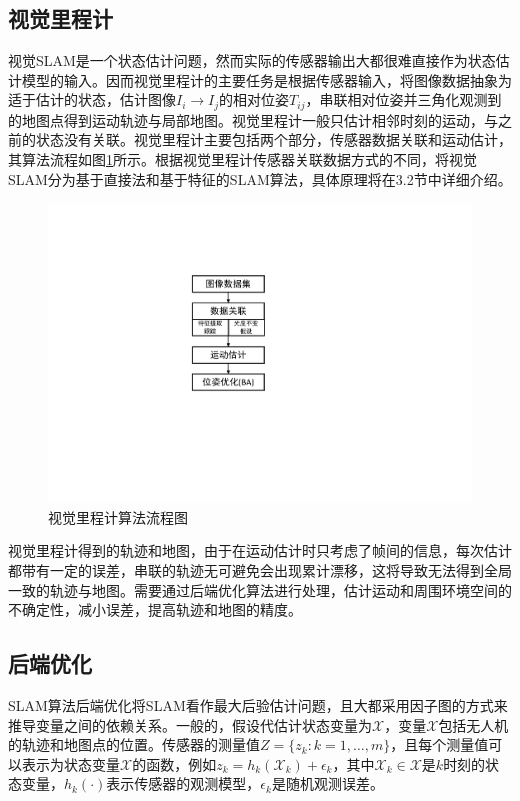 \subsection{视觉里程计}
视觉SLAM是一个状态估计问题，然而实际的传感器输出大都很难直接作为状态估计模型的输入。因而视觉里程计的主要任务是根据传感器输入，将图像数据抽象为适于估计的状态，估计图像$I_i \rightarrow I_j$的相对位姿$T_{ij}$，串联相对位姿并三角化观测到的地图点得到运动轨迹与局部地图。视觉里程计一般只估计相邻时刻的运动，与之前的状态没有关联。视觉里程计主要包括两个部分，传感器数据关联和运动估计\upcite{[1.39]}，其算法流程如图\ref{fig3.2}所示。根据视觉里程计传感器关联数据方式的不同，将视觉SLAM分为基于直接法和基于特征的SLAM算法，具体原理将在3.2节中详细介绍。

\begin{figure}[h]
\centering
\includegraphics[scale=0.7,angle=-90]{figures/Fig3-2.pdf}
\caption{视觉里程计算法流程图}
\label{fig3.2}
\end{figure}

视觉里程计得到的轨迹和地图，由于在运动估计时只考虑了帧间的信息，每次估计都带有一定的误差，串联的轨迹无可避免会出现累计漂移，这将导致无法得到全局一致的轨迹与地图。需要通过后端优化算法进行处理，估计运动和周围环境空间的不确定性，减小误差，提高轨迹和地图的精度。


\subsection{后端优化}
SLAM算法后端优化将SLAM看作最大后验估计问题，且大都采用因子图的方式来推导变量之间的依赖关系\upcite{[3.2]}。一般的，假设代估计状态变量为$\mathcal{X}$，变量$\mathcal{X}$包括无人机的轨迹和地图点的位置。传感器的测量值$Z=\lbrace z_k:k=1,\ldots ,m\rbrace$，且每个测量值可以表示为状态变量$\mathcal{X}$的函数，例如$z_k=h_k\left( \mathcal{X}_k \right)+\epsilon_k$，其中$\mathcal{X}_k \in \mathcal{X}$是$k$时刻的状态变量，$h_k(\cdot)$表示传感器的观测模型，$\epsilon_k$是随机观测误差。


